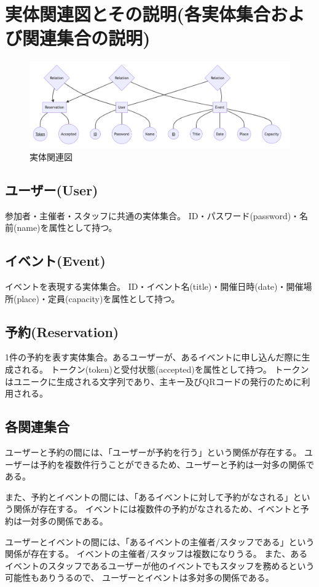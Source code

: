 \documentclass[dvipdfmx]{jarticle}
\begin{document}
\section{実体関連図とその説明(各実体集合および関連集合の説明)}

\begin{figure}[H]
    \centering
    \includegraphics[scale=0.4]{ermodel.png}
    \caption{実体関連図}
\end{figure}

\subsection{ユーザー(User)}
参加者・主催者・スタッフに共通の実体集合。
ID・パスワード(password)・名前(name)を属性として持つ。

\subsection{イベント(Event)}
イベントを表現する実体集合。
ID・イベント名(title)・開催日時(date)・開催場所(place)・定員(capacity)を属性として持つ。

\subsection{予約(Reservation)}
1件の予約を表す実体集合。あるユーザーが、あるイベントに申し込んだ際に生成される。
トークン(token)と受付状態(accepted)を属性として持つ。
トークンはユニークに生成される文字列であり、主キー及びQRコードの発行のために利用される。

\subsection{各関連集合}
ユーザーと予約の間には、「ユーザーが予約を行う」という関係が存在する。
ユーザーは予約を複数件行うことができるため、ユーザーと予約は一対多の関係である。

また、予約とイベントの間には、「あるイベントに対して予約がなされる」という関係が存在する。
イベントには複数件の予約がなされるため、イベントと予約は一対多の関係である。

ユーザーとイベントの間には、「あるイベントの主催者/スタッフである」という関係が存在する。
イベントの主催者/スタッフは複数になりうる。
また、あるイベントのスタッフであるユーザーが他のイベントでもスタッフを務めるという可能性もありうるので、
ユーザーとイベントは多対多の関係である。
\end{document}
